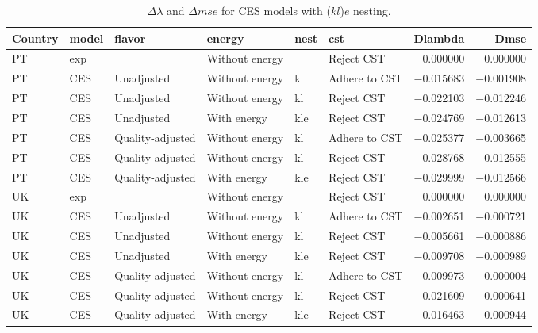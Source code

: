\documentclass[preprint,authoryear,12pt]{elsarticle}\usepackage[]{graphicx}\usepackage[]{color}
\begin{document}
\begin{table}[ht]
\centering
\caption{$\Delta \lambda$ and $\Delta mse$ for CES models with ($kl$)$e$ nesting.} 
\label{tab:DSRmse_CESkle}
{\tiny
\begin{tabular}{llllllrr}
  \hline
Country & model & flavor & energy & nest & cst & Dlambda & Dmse \\ 
  \hline
PT & exp &  & Without energy &  & Reject CST & 0.000000 & 0.000000 \\ 
  PT & CES & Unadjusted & Without energy & kl & Adhere to CST & $-$0.015683 & $-$0.001908 \\ 
  PT & CES & Unadjusted & Without energy & kl & Reject CST & $-$0.022103 & $-$0.012246 \\ 
  PT & CES & Unadjusted & With energy & kle & Reject CST & $-$0.024769 & $-$0.012613 \\ 
  PT & CES & Quality-adjusted & Without energy & kl & Adhere to CST & $-$0.025377 & $-$0.003665 \\ 
  PT & CES & Quality-adjusted & Without energy & kl & Reject CST & $-$0.028768 & $-$0.012555 \\ 
  PT & CES & Quality-adjusted & With energy & kle & Reject CST & $-$0.029999 & $-$0.012566 \\ 
  UK & exp &  & Without energy &  & Reject CST & 0.000000 & 0.000000 \\ 
  UK & CES & Unadjusted & Without energy & kl & Adhere to CST & $-$0.002651 & $-$0.000721 \\ 
  UK & CES & Unadjusted & Without energy & kl & Reject CST & $-$0.005661 & $-$0.000886 \\ 
  UK & CES & Unadjusted & With energy & kle & Reject CST & $-$0.009708 & $-$0.000989 \\ 
  UK & CES & Quality-adjusted & Without energy & kl & Adhere to CST & $-$0.009973 & $-$0.000004 \\ 
  UK & CES & Quality-adjusted & Without energy & kl & Reject CST & $-$0.021609 & $-$0.000641 \\ 
  UK & CES & Quality-adjusted & With energy & kle & Reject CST & $-$0.016463 & $-$0.000944 \\ 
   \hline
\end{tabular}
}
\end{table}
\end{document}
